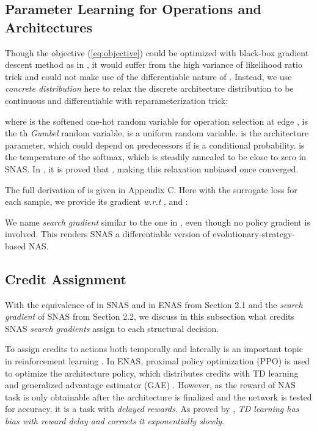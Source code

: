 \documentclass{article} \usepackage{iclr2019_conference,times}
\newcommand{\zh}{\color{black}}
\begin{document}
\subsection{Parameter Learning for Operations and Architectures}
Though the objective (\ref{eq:objective}) could be optimized with black-box gradient descent method as in \citet{ranganath2014black}, it would suffer from the high variance of likelihood ratio trick \citep{williams1992simple} and could not make use of the differentiable nature of . {\zh Instead}, we use \textit{concrete distribution} \citep{maddison2016concrete} here to relax the discrete architecture distribution to be continuous and differentiable with reparameterization trick:

where  is the softened one-hot random variable for operation selection at edge ,  is the th \textit{Gumbel} random variable,  is a uniform random variable.  is the architecture parameter, which could depend on predecessors  if  is a conditional probability.  is the temperature of the softmax, which is steadily annealed to be close to zero in SNAS. In \citet{maddison2016concrete}, it is proved that , making this relaxation unbiased once converged. 

The full derivation of  is given in Appendix C. Here with the surrogate loss  for each sample, we provide its gradient \textit{w.r.t} ,  and : 


We name  \textit{search gradient} similar {\zh to} the one in \citet{wierstra2008natural}, even though no policy gradient is involved. This renders SNAS a differentiable version of evolutionary-strategy-based NAS.

\subsection{Credit Assignment}
With the equivalence of  in SNAS and  in ENAS from Section 2.1 and the \textit{search gradient} of SNAS from Section 2.2, we discuss in this subsection what credits SNAS \textit{search gradients} assign to each structural decision. 

To assign credits to actions both temporally and laterally is an important topic in reinforcement learning \citep{precup2000eligibility, schulman2015high, tucker2018mirage, xu2018meta}. In ENAS, proximal policy optimization (PPO) \citep{schulman2017proximal} is used to optimize the architecture policy, which distributes credits with TD learning and generalized advantage estimator (GAE) \citep{schulman2015high}. However, as the reward of NAS task is only obtainable after the architecture is finalized and the network is tested for accuracy, it is a task with \textit{delayed rewards}. As proved by \citet{arjona2018rudder}, \textit{TD learning has bias with reward delay and corrects it exponentially slowly}. 
\end{document}
